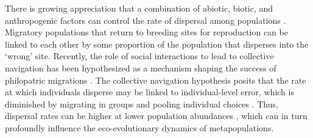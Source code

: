 \documentclass{revtex4}
\begin{document}
There is growing appreciation that a combination of abiotic, biotic, and anthropogenic factors can control the rate of dispersal among populations \citep{Travis:2013en,H:2013fs,Keefer:2014gg,Bett:2017ha}.
Migratory populations that return to breeding sites for reproduction can be linked to each other by some proportion of the population that disperses into the `wrong' site. 
Recently, the role of social interactions to lead to collective navigation has been hypothesized  as a mechanism shaping the success of philopatric migrations \citep{Berdahl:2016dx,HardestyMoore:wg,Berdahl:2017uu}.
The collective navigation hypothesis posits that the rate at which individuals disperse may be linked to individual-level error, which is diminished by migrating in groups and pooling individual choices \citep{Simons:2004jo,Berdahl:2016dx,Berdahl:2017uu}.
Thus, dispersal rates can be higher at lower population abundances \citep{Berdahl:2014bl}, which can in turn profoundly influence the eco-evolutionary dynamics of metapopulations. 



\end{document}
